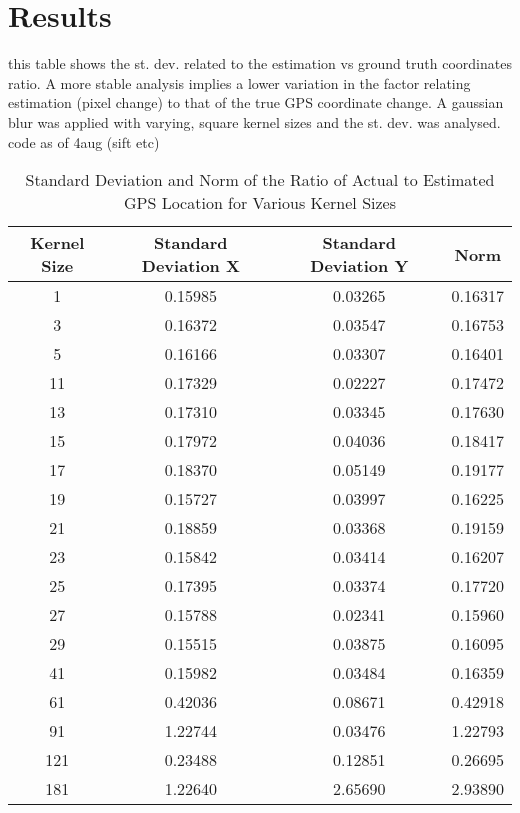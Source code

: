 \chapter{Results}
this table shows the st. dev. related to the estimation vs ground truth coordinates ratio. A more stable analysis implies a lower variation in the factor relating estimation (pixel change) to that of the true GPS coordinate change. A gaussian blur was applied with varying, square kernel sizes and the st. dev. was analysed.  
code as of 4aug (sift etc)


\begin{table}[H]
    \centering
    \begin{tabular}{|c|c|c|c|}
        \hline
        \textbf{Kernel Size} & \textbf{Standard Deviation X} & \textbf{Standard Deviation Y} & \textbf{Norm} \\
        \hline
        1   & 0.15985 & 0.03265 & 0.16317 \\
        3   & 0.16372 & 0.03547 & 0.16753 \\
        5   & 0.16166 & 0.03307 & 0.16401 \\
        11  & 0.17329 & 0.02227 & 0.17472 \\
        13  & 0.17310 & 0.03345 & 0.17630 \\
        15  & 0.17972 & 0.04036 & 0.18417 \\
        17  & 0.18370 & 0.05149 & 0.19177 \\
        19  & 0.15727 & 0.03997 & 0.16225 \\
        21  & 0.18859 & 0.03368 & 0.19159 \\
        23  & 0.15842 & 0.03414 & 0.16207 \\
        25  & 0.17395 & 0.03374 & 0.17720 \\
        27  & 0.15788 & 0.02341 & 0.15960 \\
        29  & 0.15515 & 0.03875 & 0.16095 \\
        41  & 0.15982 & 0.03484 & 0.16359 \\
        61  & 0.42036 & 0.08671 & 0.42918 \\
        91  & 1.22744 & 0.03476 & 1.22793 \\
        121 & 0.23488 & 0.12851 & 0.26695 \\
        181 & 1.22640 & 2.65690 & 2.93890 \\
        \hline
    \end{tabular}
    \caption{Standard Deviation and Norm of the Ratio of Actual to Estimated GPS Location for Various Kernel Sizes}
    \label{tab:stdev_norm}
\end{table}

